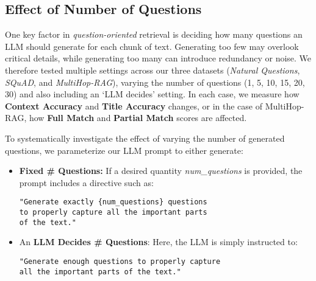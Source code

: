 

\iffalse
\subsection{Effect of kNN}

How many chunks should be retrieved and is perf improvement consistent over all values of k?

Use Naive RAG as baseline and show \% improvement?
To squeeze all datasets into one plot
\fi



\subsection{Effect of Number of Questions}
\label{subsec:num-questions}

One key factor in \emph{question-oriented} retrieval is deciding how many questions an LLM should generate for each chunk of text. 
Generating too few may overlook critical details, while generating too many can introduce redundancy or noise. 
We therefore tested multiple settings across our three datasets (\emph{Natural Questions}, \emph{SQuAD}, and \emph{MultiHop-RAG}), 
varying the number of questions (1, 5, 10, 15, 20, 30) and also including an `LLM decides' setting.
In each case, we measure how \textbf{Context Accuracy} and \textbf{Title Accuracy} changes, or in the case of MultiHop-RAG, 
how \textbf{Full Match} and \textbf{Partial Match} scores are affected.

To systematically investigate the effect of varying the number of generated questions, we parameterize our LLM prompt to either generate:
\begin{itemize}
    \item \textbf{Fixed \# Questions:} If a desired quantity \textit{num\_questions} is provided, the prompt includes a directive such as:

\begin{verbatim}
"Generate exactly {num_questions} questions 
to properly capture all the important parts
of the text."
\end{verbatim}

    \item An \textbf{LLM Decides \# Questions}: Here, the LLM is simply instructed to:

\begin{verbatim}
"Generate enough questions to properly capture
all the important parts of the text."
\end{verbatim}
\end{itemize}

